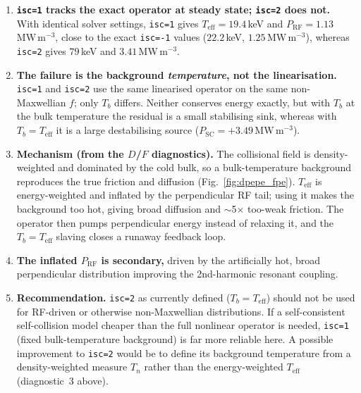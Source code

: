 \documentclass[11pt,a4paper]{article}
\begin{document}
\begin{enumerate}
  \item \textbf{\texttt{isc=1} tracks the exact operator at steady state;
        \texttt{isc=2} does not.} With identical solver settings,
        \texttt{isc=1} gives $T_\text{eff} = 19.4$\,keV and
        $P_\text{RF} = 1.13$\,MW\,m$^{-3}$, close to the exact
        \texttt{isc=-1} values ($22.2$\,keV, $1.25$\,MW\,m$^{-3}$), whereas
        \texttt{isc=2} gives $79$\,keV and $3.41$\,MW\,m$^{-3}$.

  \item \textbf{The failure is the background \emph{temperature}, not the
        linearisation.} \texttt{isc=1} and \texttt{isc=2} use the same
        linearised operator on the same non-Maxwellian $f$; only $T_b$
        differs. Neither conserves energy exactly, but with $T_b$ at the bulk
        temperature the residual is a small stabilising sink, whereas with
        $T_b = T_\text{eff}$ it is a large destabilising source
        ($P_\text{SC} = +3.49$\,MW\,m$^{-3}$).

  \item \textbf{Mechanism (from the $D$/$F$ diagnostics).} The collisional
        field is density-weighted and dominated by the cold bulk, so a
        bulk-temperature background reproduces the true friction and diffusion
        (Fig.~\ref{fig:dpepe_fpe}). $T_\text{eff}$ is energy-weighted and
        inflated by the perpendicular RF tail; using it makes the background
        too hot, giving broad diffusion and $\sim$5$\times$ too-weak friction.
        The operator then pumps perpendicular energy instead of relaxing it,
        and the $T_b = T_\text{eff}$ slaving closes a runaway feedback loop.

  \item \textbf{The inflated $P_\text{RF}$ is secondary,} driven by the
        artificially hot, broad perpendicular distribution improving the
        2nd-harmonic resonant coupling.

  \item \textbf{Recommendation.} \texttt{isc=2} as currently defined
        ($T_b = T_\text{eff}$) should not be used for RF-driven or otherwise
        non-Maxwellian distributions. If a self-consistent self-collision
        model cheaper than the full nonlinear operator is needed,
        \texttt{isc=1} (fixed bulk-temperature background) is far more
        reliable here. A possible improvement to \texttt{isc=2} would be to
        define its background temperature from a density-weighted measure
        $T_n$ rather than the energy-weighted $T_\text{eff}$ (diagnostic~3
        above).
\end{enumerate}
\end{document}
